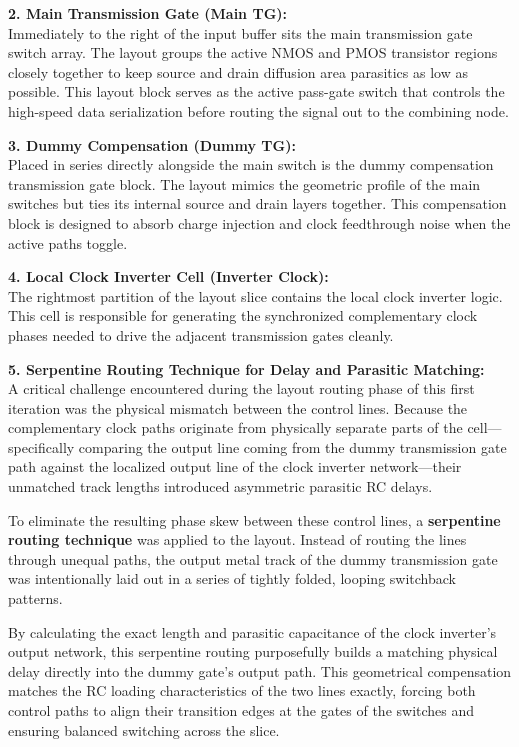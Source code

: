 \textbf{2. Main Transmission Gate  (Main TG):} \\
Immediately to the right of the input buffer sits the main transmission gate switch array. The layout groups the active NMOS and PMOS transistor regions closely together to keep source and drain diffusion area parasitics as low as possible. This layout block serves as the active pass-gate switch that controls the high-speed data serialization before routing the signal out to the combining node.

\textbf{3. Dummy Compensation  (Dummy TG):} \\
Placed in series directly alongside the main switch is the dummy compensation transmission gate block. The layout mimics the geometric profile of the main switches but ties its internal source and drain layers together. This compensation block is designed to absorb charge injection and clock feedthrough noise when the active paths toggle.

\textbf{4. Local Clock Inverter Cell (Inverter Clock):} \\
The rightmost partition of the layout slice contains the local clock inverter logic. This cell is responsible for generating the synchronized complementary clock phases needed to drive the adjacent transmission gates cleanly.


\textbf{5. Serpentine Routing Technique for Delay and Parasitic Matching:} \\
A critical challenge encountered during the layout routing phase of this first iteration was the physical mismatch between the control lines. Because the complementary clock paths originate from physically separate parts of the cell—specifically comparing the output line coming from the dummy transmission gate path against the localized output line of the clock inverter network—their unmatched track lengths introduced asymmetric parasitic RC delays. 

To eliminate the resulting phase skew between these control lines, a \textbf{serpentine routing technique} was applied to the layout. Instead of routing the lines through unequal paths, the output metal track of the dummy transmission gate was intentionally laid out in a series of tightly folded, looping switchback patterns. 

By calculating the exact length and parasitic capacitance of the clock inverter's output network, this serpentine routing purposefully builds a matching physical delay directly into the dummy gate's output path. This geometrical compensation matches the RC loading characteristics of the two lines exactly, forcing both control paths to align their transition edges at the gates of the switches and ensuring balanced switching across the slice.

